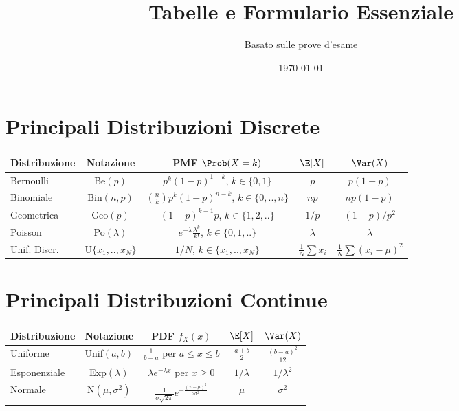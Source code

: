 

\title{Tabelle e Formulario Essenziale}
\author{Basato sulle prove d'esame}
\date{\today}



\maketitle
\tableofcontents
\newpage

\section{Principali Distribuzioni Discrete}
\begin{tabular}{|l|c|c|c|c|}
\hline
Distribuzione & Notazione & PMF $\Prob(X=k)$ & $\E[X]$ & $\Var(X)$ \\ \hline
Bernoulli & Be$(p)$ & $p^k(1-p)^{1-k}$, $k \in \{0,1\}$ & $p$ & $p(1-p)$ \\ \hline
Binomiale & Bin$(n,p)$ & $\binom{n}{k}p^k(1-p)^{n-k}$, $k \in \{0,..,n\}$ & $np$ & $np(1-p)$ \\ \hline
Geometrica & Geo$(p)$ & $(1-p)^{k-1}p$, $k \in \{1,2,..\}$ & $1/p$ & $(1-p)/p^2$ \\ \hline
Poisson & Po$(\lambda)$ & $e^{-\lambda}\frac{\lambda^k}{k!}$, $k \in \{0,1,..\}$ & $\lambda$ & $\lambda$ \\ \hline
Unif. Discr. & U$\{x_1,..,x_N\}$ & $1/N$, $k \in \{x_1,..,x_N\}$ & $\frac{1}{N}\sum x_i$ & $\frac{1}{N}\sum (x_i-\mu)^2$ \\ \hline
\end{tabular}

\section{Principali Distribuzioni Continue}
\begin{tabular}{|l|c|c|c|c|}
\hline
Distribuzione & Notazione & PDF $f_X(x)$ & $\E[X]$ & $\Var(X)$ \\ \hline
Uniforme & Unif$(a,b)$ & $\frac{1}{b-a}$ per $a \le x \le b$ & $\frac{a+b}{2}$ & $\frac{(b-a)^2}{12}$ \\ \hline
Esponenziale & Exp$(\lambda)$ & $\lambda e^{-\lambda x}$ per $x \ge 0$ & $1/\lambda$ & $1/\lambda^2$ \\ \hline
Normale & N$(\mu, \sigma^2)$ & $\frac{1}{\sigma\sqrt{2\pi}}e^{-\frac{(x-\mu)^2}{2\sigma^2}}$ & $\mu$ & $\sigma^2$ \\ \hline
\end{tabular}

